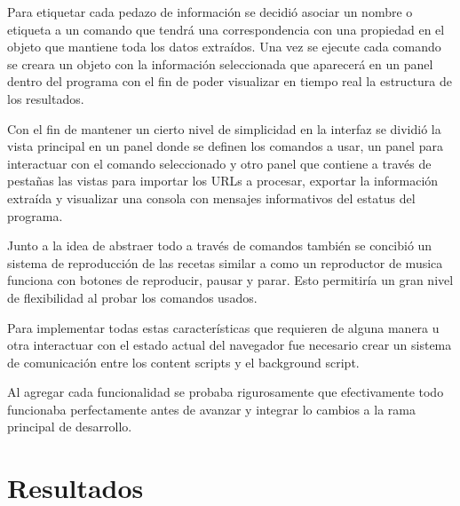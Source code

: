 \documentclass[12pt]{report}
\begin{document}
Para etiquetar cada pedazo de información se decidió asociar un nombre o etiqueta a un comando que tendrá una correspondencia con una propiedad en el objeto que mantiene toda los datos extraídos. Una vez se ejecute cada comando se creara un objeto con la información seleccionada que aparecerá en un panel dentro del programa con el fin de poder visualizar en tiempo real la estructura de los resultados.

Con el fin de mantener un cierto nivel de simplicidad en la interfaz se dividió la vista principal en un panel donde se definen los comandos a usar, un panel para interactuar con el comando seleccionado y otro panel que contiene a través de pestañas las vistas para importar los URLs a procesar, exportar la información extraída y visualizar una consola con mensajes informativos del estatus del programa.


Junto a la idea de abstraer todo a través de comandos también se concibió un sistema de reproducción de las recetas similar a como un reproductor de musica funciona con botones de reproducir, pausar y parar. Esto permitiría un gran nivel de flexibilidad al probar los comandos usados.

Para implementar todas estas características que requieren de alguna manera u otra interactuar con el estado actual del navegador fue necesario crear un sistema de comunicación entre los content scripts y el background script.

Al agregar cada funcionalidad se probaba rigurosamente que efectivamente todo funcionaba perfectamente antes de avanzar y integrar lo cambios a la rama principal de desarrollo.

\break



\break


\chapter{Resultados}



\end{document}
